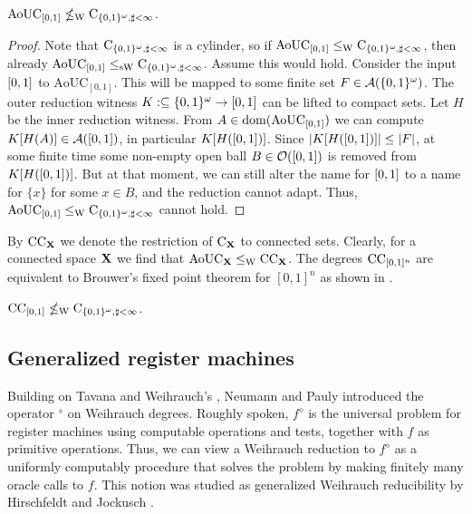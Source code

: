 \documentclass{eptcs-modified}
\begin{document}
\begin{proposition}
$\mathrm{AoUC}_{[0,1]} \nleq_{\textrm{W}} \textrm{C}_{{\{0,1\}^\omega},\sharp<\infty}$.
\begin{proof}
Note that $\textrm{C}_{{\{0,1\}^\omega},\sharp<\infty}$ is a cylinder, so if $\mathrm{AoUC}_{[0,1]} \leq_{\textrm{W}} \textrm{C}_{{\{0,1\}^\omega},\sharp<\infty}$, then already $\mathrm{AoUC}_{[0,1]} \leq_{\mathrm{sW}} \textrm{C}_{{\{0,1\}^\omega},\sharp<\infty}$. Assume this would hold. Consider the input ${[0, 1]}$ to $\mathrm{AoUC}_{[0,1]}$. This will be mapped to some finite set $F \in \mathcal{A}({\{0,1\}^\omega})$. The outer reduction witness $K : \subseteq {\{0,1\}^\omega} \to {[0, 1]}$ can be lifted to compact sets. Let $H$ be the inner reduction witness. From $A \in \operatorname{dom}(\mathrm{AoUC}_{[0,1]})$ we can compute $K[H(A)] \in \mathcal{A}({[0, 1]})$, in particular $K[H({[0, 1]})]$. Since $|K[H({[0, 1]})]| \leq |F|$, at some finite time some non-empty open ball $B \in \mathcal{O}({[0, 1]})$ is removed from $K[H({[0, 1]})]$. But at that moment, we can still alter the name for ${[0, 1]}$ to a name for $\{x\}$ for some $x \in B$, and the reduction cannot adapt. Thus, $\mathrm{AoUC}_{[0,1]} \leq_{\textrm{W}} \textrm{C}_{{\{0,1\}^\omega},\sharp<\infty}$ cannot hold.
\end{proof}
\end{proposition}

By $\textrm{CC}_{\mathbf{X}}$ we denote the restriction of $\textrm{C}_{\mathbf{X}}$ to connected sets. Clearly, for a connected space $\mathbf{X}$ we find that $\mathrm{AoUC}_{\mathbf{X}} \leq_{\textrm{W}} \textrm{CC}_{\mathbf{X}}$. The degrees $\textrm{CC}_{[0,1]^n}$ are equivalent to Brouwer's fixed point theorem for $[0,1]^n$ as shown in \cite{paulybrattka3}.

\begin{corollary}
$\textrm{CC}_{{[0, 1]}} \nleq_{\textrm{W}} \textrm{C}_{{\{0,1\}^\omega},\sharp<\infty}$.
\end{corollary}

\subsection{Generalized register machines}
Building on Tavana and Weihrauch's \cite{tavana}, Neumann and Pauly \cite{paulyneumann} introduced the operator $^\diamond$ on Weihrauch degrees. Roughly spoken, $f^\diamond$ is the universal problem for register machines using computable operations and tests, together with $f$ as primitive operations. Thus, we can view a Weihrauch reduction to $f^\diamond$ as a uniformly computably procedure that solves the problem by making finitely many oracle calls to $f$. This notion was studied as generalized Weihrauch reducibility by Hirschfeldt and Jockusch \cite{hirschfeldt,hirschfeldt2}.
\end{document}
